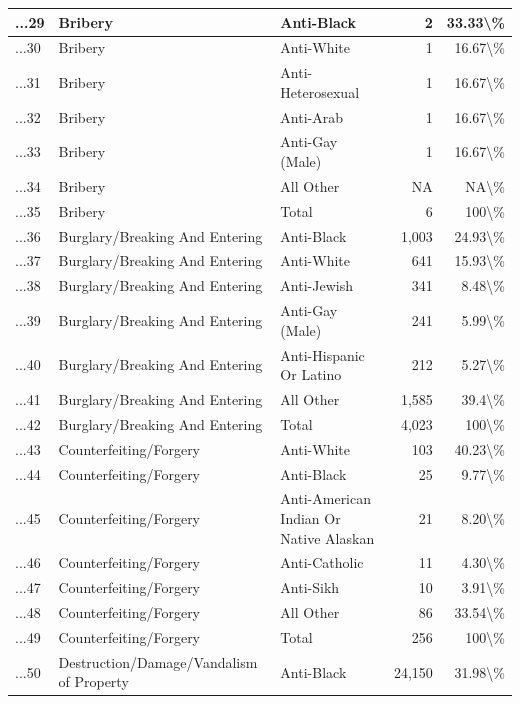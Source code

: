 \documentclass[
]{krantz}
\begin{document}
\begin{longtable}[t]{l|l|l|r|r}
\hline
...29 & Bribery & Anti-Black & 2 & 33.33\textbackslash{}\%\\
\hline
...30 & Bribery & Anti-White & 1 & 16.67\textbackslash{}\%\\
\hline
...31 & Bribery & Anti-Heterosexual & 1 & 16.67\textbackslash{}\%\\
\hline
...32 & Bribery & Anti-Arab & 1 & 16.67\textbackslash{}\%\\
\hline
...33 & Bribery & Anti-Gay (Male) & 1 & 16.67\textbackslash{}\%\\
\hline
...34 & Bribery & All Other & NA & NA\textbackslash{}\%\\
\hline
...35 & Bribery & Total & 6 & 100\textbackslash{}\%\\
\hline
...36 & Burglary/Breaking And Entering & Anti-Black & 1,003 & 24.93\textbackslash{}\%\\
\hline
...37 & Burglary/Breaking And Entering & Anti-White & 641 & 15.93\textbackslash{}\%\\
\hline
...38 & Burglary/Breaking And Entering & Anti-Jewish & 341 & 8.48\textbackslash{}\%\\
\hline
...39 & Burglary/Breaking And Entering & Anti-Gay (Male) & 241 & 5.99\textbackslash{}\%\\
\hline
...40 & Burglary/Breaking And Entering & Anti-Hispanic Or Latino & 212 & 5.27\textbackslash{}\%\\
\hline
...41 & Burglary/Breaking And Entering & All Other & 1,585 & 39.4\textbackslash{}\%\\
\hline
...42 & Burglary/Breaking And Entering & Total & 4,023 & 100\textbackslash{}\%\\
\hline
...43 & Counterfeiting/Forgery & Anti-White & 103 & 40.23\textbackslash{}\%\\
\hline
...44 & Counterfeiting/Forgery & Anti-Black & 25 & 9.77\textbackslash{}\%\\
\hline
...45 & Counterfeiting/Forgery & Anti-American Indian Or Native Alaskan & 21 & 8.20\textbackslash{}\%\\
\hline
...46 & Counterfeiting/Forgery & Anti-Catholic & 11 & 4.30\textbackslash{}\%\\
\hline
...47 & Counterfeiting/Forgery & Anti-Sikh & 10 & 3.91\textbackslash{}\%\\
\hline
...48 & Counterfeiting/Forgery & All Other & 86 & 33.54\textbackslash{}\%\\
\hline
...49 & Counterfeiting/Forgery & Total & 256 & 100\textbackslash{}\%\\
\hline
...50 & Destruction/Damage/Vandalism of Property & Anti-Black & 24,150 & 31.98\textbackslash{}\%\\

\end{longtable}
\end{document}
